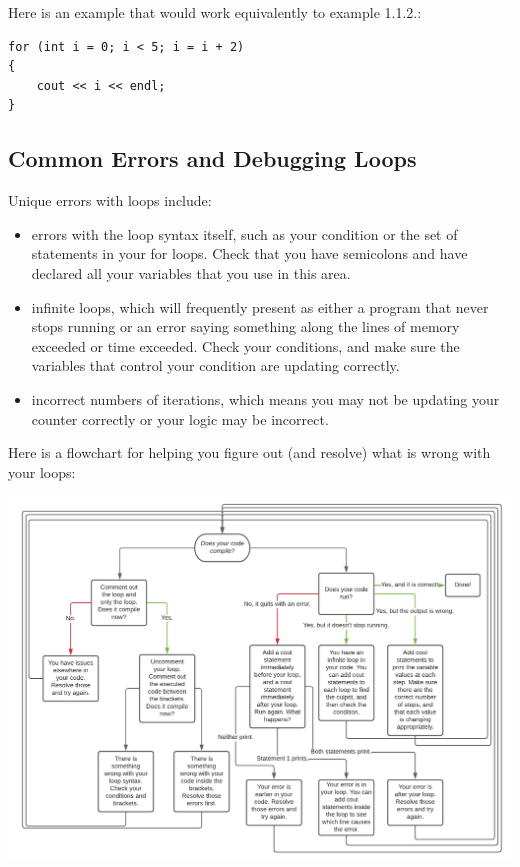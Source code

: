 \begin{example}
    Here is an example that would work equivalently to example 1.1.2.:
    \begin{verbatim}
for (int i = 0; i < 5; i = i + 2)
{
    cout << i << endl;
}
    \end{verbatim}
\end{example}

\subsection{Common Errors and Debugging Loops}

Unique errors with loops include:

\begin{itemize}
\item errors with the loop syntax itself, such as your condition or the set of statements in your for loops. Check that you have semicolons and have declared all your variables that you use in this area. 
\item infinite loops, which will frequently present as either a program that never stops running or an error saying something along the lines of memory exceeded or time exceeded. Check your conditions, and make sure the variables that control your condition are updating correctly. 
\item incorrect numbers of iterations, which means you may not be updating your counter correctly or your logic may be incorrect. 
\end{itemize}
Here is a flowchart for helping you figure out (and resolve) what is wrong with your loops:

\includegraphics[width=\textwidth]{images/Loop Debugging.png}

